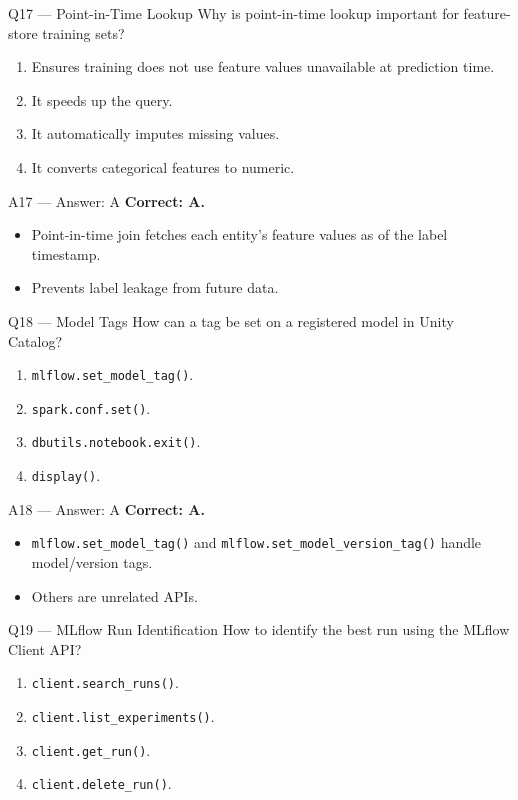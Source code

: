 \documentclass[aspectratio=169,10pt]{beamer}
\begin{document}
	\begin{frame}{Q17 — Point-in-Time Lookup}
		Why is point-in-time lookup important for feature-store training sets?
		\begin{enumerate}[label=\Alph*.]
			\item Ensures training does not use feature values unavailable at prediction time.
			\item It speeds up the query.
			\item It automatically imputes missing values.
			\item It converts categorical features to numeric.
		\end{enumerate}
	\end{frame}
	
	\begin{frame}{A17 — Answer: A}
		\textbf{Correct: A.}
		\begin{itemize}
			\item Point-in-time join fetches each entity's feature values as of the label timestamp.
			\item Prevents label leakage from future data.
		\end{itemize}
	\end{frame}
	
	\begin{frame}{Q18 — Model Tags}
		How can a tag be set on a registered model in Unity Catalog?
		\begin{enumerate}[label=\Alph*.]
			\item \texttt{mlflow.set\_model\_tag()}.
			\item \texttt{spark.conf.set()}.
			\item \texttt{dbutils.notebook.exit()}.
			\item \texttt{display()}.
		\end{enumerate}
	\end{frame}
	
	\begin{frame}{A18 — Answer: A}
		\textbf{Correct: A.}
		\begin{itemize}
			\item \texttt{mlflow.set\_model\_tag()} and \texttt{mlflow.set\_model\_version\_tag()} handle model/version tags.
			\item Others are unrelated APIs.
		\end{itemize}
	\end{frame}
	
	\begin{frame}{Q19 — MLflow Run Identification}
		How to identify the best run using the MLflow Client API?
		\begin{enumerate}[label=\Alph*.]
			\item \texttt{client.search\_runs()}.
			\item \texttt{client.list\_experiments()}.
			\item \texttt{client.get\_run()}.
			\item \texttt{client.delete\_run()}.
		\end{enumerate}
	\end{frame}
	
\end{document}
